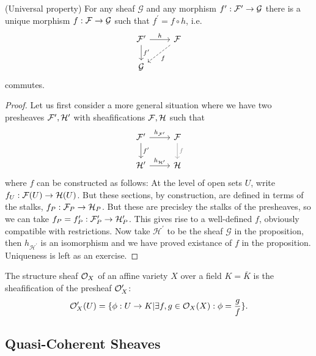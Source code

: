 \documentclass[a4paper,11pt]{article}
\begin{document}
			\begin{prop}
				(Universal property) For any sheaf $\mathcal{G}$ and any morphism $f^\prime:\mathcal{F}^\prime\rightarrow\mathcal{G}$ there is a unique morphism $f:\mathcal{F}\rightarrow\mathcal{G}$ such that $f^\prime=f\circ h$, i.e.
				\begin{equation*}
					\begin{tikzcd}
						\F^\prime\ar[r,"h"]\ar[d,"f^\prime"] & \F\ar[dl,dashed,"f"]\\ \mathcal{G}
					\end{tikzcd}
				\end{equation*}
				commutes.
			\end{prop}
			\begin{proof}
				Let us first consider a more general situation where we have two presheaves $\mathcal{F}^\prime,\mathcal{H}^\prime$ with sheafifications $\mathcal{F},\mathcal{H}$ such that 
				\begin{equation*}
					\begin{tikzcd}
						\F^\prime \ar[r,"h_{\F^\prime}"]\ar[d,"f^\prime"] & \F \ar[d,gray,"f"]\\
						\mathcal{H}^\prime \ar[r,"h_{\mathcal{H}^\prime}"] & \mathcal{H}
					\end{tikzcd}
				\end{equation*}
				where $f$ can be constructed as follows: At the level of open sets $U$, write $f_U:\mathcal{F}(U)\rightarrow\mathcal{H}(U)$. But these sections, by construction, are defined in terms of the stalks, $f_P:\mathcal{F}_P\rightarrow\mathcal{H}_P$. But these are precisley the stalks of the presheaves, so we can take $f_P=f^\prime_P:\mathcal{F}^\prime_P\rightarrow\mathcal{H}^\prime_P$. This gives rise to a well-defined $f$, obviously compatible with restrictions. Now take $\mathcal{H}^\prime$ to be the sheaf $\mathcal{G}$ in the proposition, then $h_{\mathcal{H}^\prime}$ is an isomorphism and we have proved existance of $f$ in the proposition. Uniqueness is left as an exercise.  
			\end{proof}

			\begin{eg}
				The structure sheaf $\mathcal{O}_X$ of an affine variety $X$ over a field $K=\bar{K}$ is the sheafification of the presheaf $\mathcal{O}_X^\prime$:
				\begin{equation*}
					\mathcal{O}^\prime_X(U)=\{\phi:U\rightarrow K|\exists f,g\in\mathcal{O}_X(X):\phi=\frac{g}{f}\}.
				\end{equation*}
			\end{eg}


		\subsection{Quasi-Coherent Sheaves}
\end{document}
